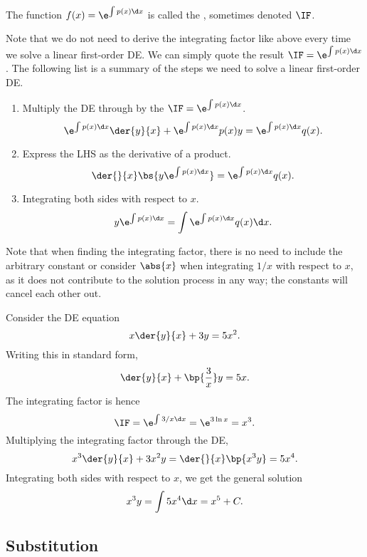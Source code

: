 \begin{definition}
    The function $f(x) = \e^{\int p(x) \d x}$ is called the , sometimes denoted $\IF$.
\end{definition}

Note that we do not need to derive the integrating factor like above every time we solve a linear first-order DE. We can simply quote the result $\IF = \e^{\int p(x) \d x}$. The following list is a summary of the steps we need to solve a linear first-order DE.

\begin{recipe}
    \phantom{.}
    \renewcommand{\theenumi}{\arabic{enumi}.}%
    \begin{enumerate}
        \item Multiply the DE through by the $\IF = \e^{\int p(x) \d x}$. \[\e^{\int p(x) \d x} \der{y}{x} + \e^{\int p(x) \d x} p(x) y = \e^{\int p(x) \d x} q(x).\]
        \item Express the LHS as the derivative of a product. \[\der{}{x} \bs{y \e^{\int p(x) \d x}} = \e^{\int p(x) \d x} q(x).\]
        \item Integrating both sides with respect to $x$. \[y \e^{\int p(x) \d x} = \int \e^{\int p(x) \d x} q(x) \d x.\]
    \end{enumerate}
    \renewcommand{\theenumi}{(\alph{enumi})}
\end{recipe}

Note that when finding the integrating factor, there is no need to include the arbitrary constant or consider $\abs{x}$ when integrating $1/x$ with respect to $x$, as it does not contribute to the solution process in any way; the constants will cancel each other out.

\begin{example}
    Consider the DE equation \[x \der{y}{x} + 3y = 5x^2.\] Writing this in standard form, \[\der{y}{x} + \bp{\frac3x}y = 5x.\] The integrating factor is hence \[\IF = \e^{\int 3/x \d x} = \e^{3\ln x} = x^3.\] Multiplying the integrating factor through the DE, \[x^3 \der{y}{x} + 3x^2 y = \der{}{x} \bp{x^3 y} = 5x^4.\] Integrating both sides with respect to $x$, we get the general solution \[x^3 y = \int 5x^4 \d x = x^5 + C.\]
\end{example}

\subsection{Substitution}

